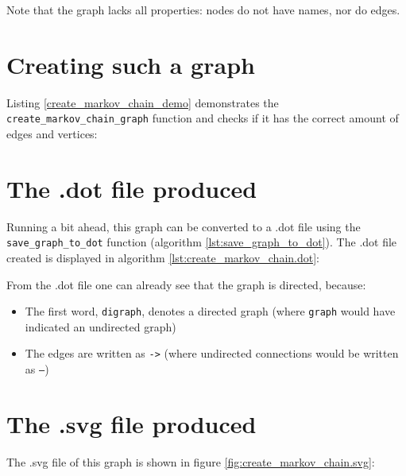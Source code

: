 Note that the graph lacks all properties: nodes do not have names, nor do
edges.

\section{Creating such a graph}

Listing \ref{create_markov_chain_demo} demonstrates 
the \verb;create_markov_chain_graph; function and checks if it
has the correct amount of edges and vertices:



\section{The .dot file produced}
\label{subsec:create_markov_chain_dot}

Running a bit ahead, this graph can be converted to a .dot file using the
\verb;save_graph_to_dot; function (algorithm \ref{lst:save_graph_to_dot}).
The .dot file created is displayed in algorithm \ref{lst:create_markov_chain.dot}:



From the .dot file one can already see that the graph is directed, because:

\begin{itemize}
  \item The first word, \verb;digraph;, denotes a directed graph 
    (where \verb;graph; would have indicated an undirected graph)
  \item The edges are written as \verb;->; 
   (where undirected connections would be written as \verb;–;)
\end{itemize}

\section{The .svg file produced}
\label{subsec:create_markov_chain.svg}

The .svg file of this graph is shown in figure \ref{fig:create_markov_chain.svg}:

